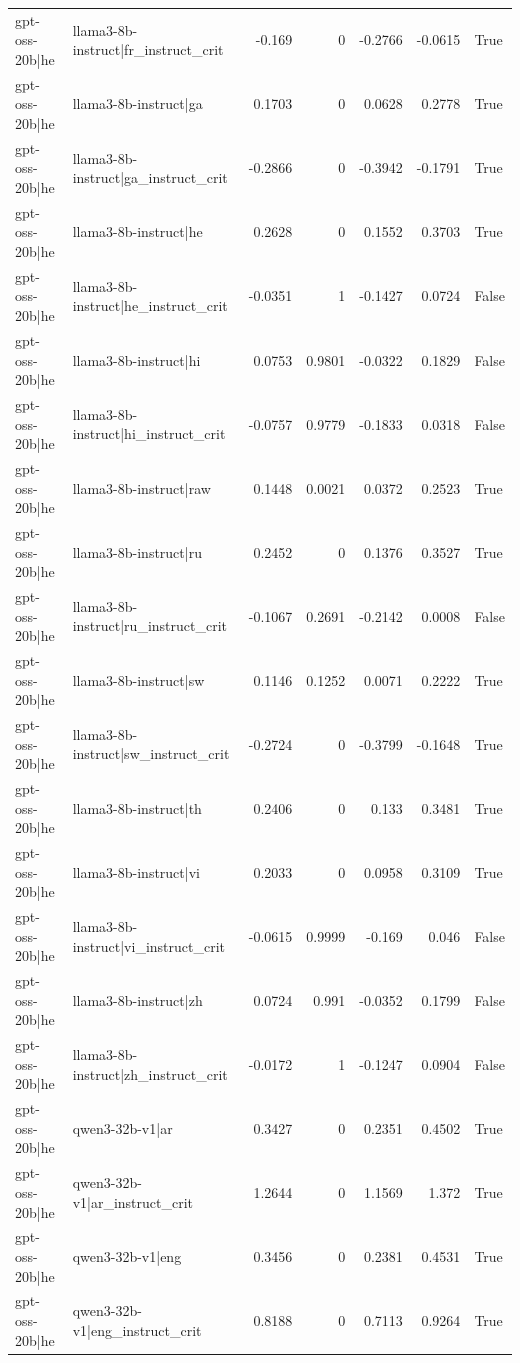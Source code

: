 \begin{table}
\begin{tabular}{l l r r r r l}
gpt-oss-20b|he & llama3-8b-instruct|fr_instruct_crit & -0.169 & 0 & -0.2766 & -0.0615 & True \\
gpt-oss-20b|he & llama3-8b-instruct|ga & 0.1703 & 0 & 0.0628 & 0.2778 & True \\
gpt-oss-20b|he & llama3-8b-instruct|ga_instruct_crit & -0.2866 & 0 & -0.3942 & -0.1791 & True \\
gpt-oss-20b|he & llama3-8b-instruct|he & 0.2628 & 0 & 0.1552 & 0.3703 & True \\
gpt-oss-20b|he & llama3-8b-instruct|he_instruct_crit & -0.0351 & 1 & -0.1427 & 0.0724 & False \\
gpt-oss-20b|he & llama3-8b-instruct|hi & 0.0753 & 0.9801 & -0.0322 & 0.1829 & False \\
gpt-oss-20b|he & llama3-8b-instruct|hi_instruct_crit & -0.0757 & 0.9779 & -0.1833 & 0.0318 & False \\
gpt-oss-20b|he & llama3-8b-instruct|raw & 0.1448 & 0.0021 & 0.0372 & 0.2523 & True \\
gpt-oss-20b|he & llama3-8b-instruct|ru & 0.2452 & 0 & 0.1376 & 0.3527 & True \\
gpt-oss-20b|he & llama3-8b-instruct|ru_instruct_crit & -0.1067 & 0.2691 & -0.2142 & 0.0008 & False \\
gpt-oss-20b|he & llama3-8b-instruct|sw & 0.1146 & 0.1252 & 0.0071 & 0.2222 & True \\
gpt-oss-20b|he & llama3-8b-instruct|sw_instruct_crit & -0.2724 & 0 & -0.3799 & -0.1648 & True \\
gpt-oss-20b|he & llama3-8b-instruct|th & 0.2406 & 0 & 0.133 & 0.3481 & True \\
gpt-oss-20b|he & llama3-8b-instruct|vi & 0.2033 & 0 & 0.0958 & 0.3109 & True \\
gpt-oss-20b|he & llama3-8b-instruct|vi_instruct_crit & -0.0615 & 0.9999 & -0.169 & 0.046 & False \\
gpt-oss-20b|he & llama3-8b-instruct|zh & 0.0724 & 0.991 & -0.0352 & 0.1799 & False \\
gpt-oss-20b|he & llama3-8b-instruct|zh_instruct_crit & -0.0172 & 1 & -0.1247 & 0.0904 & False \\
gpt-oss-20b|he & qwen3-32b-v1|ar & 0.3427 & 0 & 0.2351 & 0.4502 & True \\
gpt-oss-20b|he & qwen3-32b-v1|ar_instruct_crit & 1.2644 & 0 & 1.1569 & 1.372 & True \\
gpt-oss-20b|he & qwen3-32b-v1|eng & 0.3456 & 0 & 0.2381 & 0.4531 & True \\
gpt-oss-20b|he & qwen3-32b-v1|eng_instruct_crit & 0.8188 & 0 & 0.7113 & 0.9264 & True \\

\end{tabular}
\end{table}
